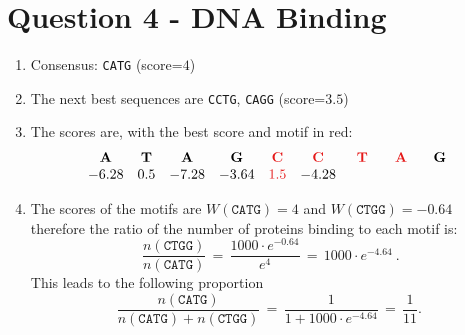 \documentclass[a4paper,11pt]{article}
\newcommand{\red}{\color[rgb]{.9,0.1,0.1}}
\begin{document}
\section*{Question 4 - DNA Binding}


\begin{enumerate}
\item Consensus: \texttt{CATG} (score=$4$)
\item The next best sequences are \texttt{CCTG}, \texttt{CAGG} (score=$3.5$)
\item The scores are, with the best score and motif in red:
$$
\begin{matrix}
\bf A&\bf T&\bf A&\bf G&\red{\bf C}&\red{\bf C}&\red{\bf T}&\red{\bf A}&\bf G\cr
-6.28&0.5&-7.28&-3.64&\red{1.5}&-4.28&\phantom{0.00}&\phantom{0.00}&\phantom{0.00}
\end{matrix}
$$
\item The scores of the motifs are $W(\texttt{CATG})=4$ and
  $W(\texttt{CTGG})=-0.64$ therefore the ratio of the number of proteins binding to
  each motif is:
$$
\frac{n(\texttt{CTGG})}{n(\texttt{CATG})}\,=\,\frac{1000\cdot e^{-0.64}}{e^4}
\,=\,1000\cdot e^{-4.64}~.
$$
This leads to the following proportion
$$
\frac{n(\texttt{CATG})}{n(\texttt{CATG})+n(\texttt{CTGG})}\,=\,\frac
1{1+1000\cdot e^{-4.64}}\,=\,\frac 1{11}.~
$$
\end{enumerate}
\end{document}
